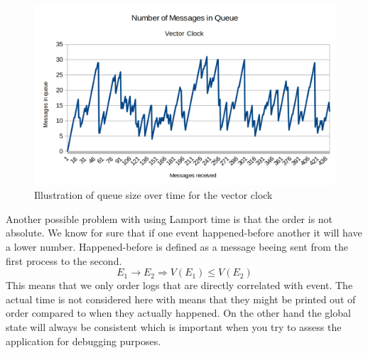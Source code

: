 \begin{figure}[h]
\centering
\includegraphics[width=0.8\linewidth]{res/vector-queue-over-time}
\caption{Illustration of queue size over time for the vector clock}
\label{fig:vector-queue-over-time}
\end{figure}

Another possible problem with using Lamport time is that the order is not absolute. We know for sure that if one event happened-before another it will have a lower number. Happened-before is defined as a message beeing sent from the first process to the second.
\[ E_1 \rightarrow E_2 \Rightarrow V(E_1) \leq V(E_2) \]
This means that we only order logs that are directly correlated with event. The actual time is not considered here with means that they might be printed out of order compared to when they actually happened. On the other hand the global state will always be consistent which is important when you try to assess the application for debugging purposes.





